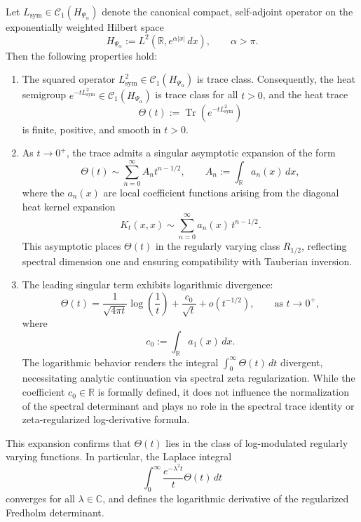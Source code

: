 \begin{lemma}
\label{lem:heat_trace_expansion}
Let \( L_{\mathrm{sym}} \in \mathcal{C}_1(H_{\Psi_\alpha}) \) denote the canonical compact, self-adjoint operator on the exponentially weighted Hilbert space
\[
H_{\Psi_\alpha} := L^2(\mathbb{R}, e^{\alpha|x|} \, dx), \qquad \alpha > \pi.
\]
Then the following properties hold:
\begin{enumerate}
    \item The squared operator \( L_{\mathrm{sym}}^2 \in \mathcal{C}_1(H_{\Psi_\alpha}) \) is trace class. Consequently, the heat semigroup \( e^{-tL_{\mathrm{sym}}^2} \in \mathcal{C}_1(H_{\Psi_\alpha}) \) is trace class for all \( t > 0 \), and the heat trace
    \[
    \Theta(t) := \operatorname{Tr}(e^{-tL_{\mathrm{sym}}^2})
    \]
    is finite, positive, and smooth in \( t > 0 \).

    \item As \( t \to 0^+ \), the trace admits a singular asymptotic expansion of the form
    \[
    \Theta(t) \sim \sum_{n=0}^{\infty} A_n t^{n - 1/2}, \qquad A_n := \int_{\mathbb{R}} a_n(x) \, dx,
    \]
    where the \( a_n(x) \) are local coefficient functions arising from the diagonal heat kernel expansion
    \[
    K_t(x,x) \sim \sum_{n=0}^{\infty} a_n(x) \, t^{n - 1/2}.
    \]
    This asymptotic places \( \Theta(t) \) in the regularly varying class \( R_{1/2} \), reflecting spectral dimension one and ensuring compatibility with Tauberian inversion.

    \item The leading singular term exhibits logarithmic divergence:
    \[
    \Theta(t) = \frac{1}{\sqrt{4\pi t}} \log\left( \frac{1}{t} \right)
    + \frac{c_0}{\sqrt{t}} + o(t^{-1/2}), \qquad \text{as } t \to 0^+,
    \]
    where
    \[
    c_0 := \int_{\mathbb{R}} a_1(x) \, dx.
    \]
    The logarithmic behavior renders the integral \( \int_0^\infty \Theta(t) \, dt \) divergent, necessitating analytic continuation via spectral zeta regularization. While the coefficient \( c_0 \in \mathbb{R} \) is formally defined, it does not influence the normalization of the spectral determinant and plays no role in the spectral trace identity or zeta-regularized log-derivative formula.
\end{enumerate}

This expansion confirms that \( \Theta(t) \) lies in the class of log-modulated regularly varying functions. In particular, the Laplace integral
\[
\int_0^\infty \frac{e^{-\lambda^2 t}}{t} \Theta(t) \, dt
\]
converges for all \( \lambda \in \mathbb{C} \), and defines the logarithmic derivative of the regularized Fredholm determinant.
\end{lemma}
